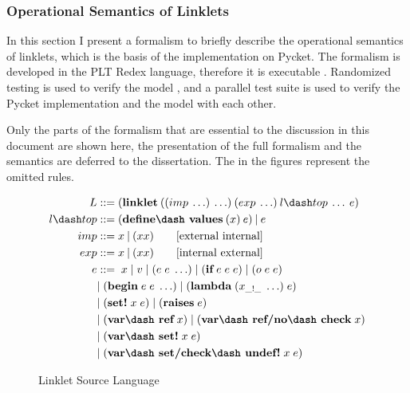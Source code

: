 \subsubsection{Operational Semantics of Linklets}
\label{subsec:linklets-semantics}

In this section I present a formalism to briefly describe the
operational semantics of linklets, which is the basis of the
implementation on Pycket. The formalism is developed in the PLT Redex
language, therefore it is executable
\cite{felleisen2009semantics}. Randomized testing is used to verify
the model \cite{random-test:2009}, and a parallel test suite is used
to verify the Pycket implementation and the model with each other.

Only the parts of the formalism that are essential to the discussion
in this document are shown here, the presentation of the full
formalism and the semantics are deferred to the
dissertation. The  in the figures represent the
omitted rules.

\begin{wrapfigure}[14]{r}{0.45\textwidth}
  \vspace{-0.7cm}
  \footnotesize
  \begin{mdframed}
    \begin{align*}
      L  &::= (\textbf{linklet}\:((imp\: \ldots)\: \ldots)\:(exp\: \ldots)\:l\dash top\:\ldots\:e)\\
      l\dash top &::= (\textbf{define\dash values}\:(x)\:e)\:|\:e \\
      imp &::= x\:|\:(x x) \tag*{[external internal]}\\
      exp &::= x\:|\:(x x) \tag*{[internal external]} \\
      e &::=\; x\; |\; v\; |\; (e\; e\; \ldots)\; |\; (\textbf{if}\; e\; e\; e)\; |\; (o\; e\; e)\; \\
      \; &|\; (\textbf{begin}\; e\; e\; \ldots)\; |\; (\textbf{lambda}\; (x_{\_!\_}\; \ldots)\; e)\\
      \; &|\; (\textbf{set!}\; x\; e)\; |\; (\textbf{raises}\; e)\\
      \; &|\; (\textbf{var\dash ref}\; x)\; |\; (\textbf{var\dash ref/no\dash check}\; x) \\
      \; &|\; (\textbf{var\dash set!}\; x\; e)  \\
      \; &|\; (\textbf{var\dash set/check\dash undef!}\; x\; e)
    \end{align*}
  \caption{Linklet Source Language}
  \label{fig:linklet-source}
  \end{mdframed}
\end{wrapfigure}


